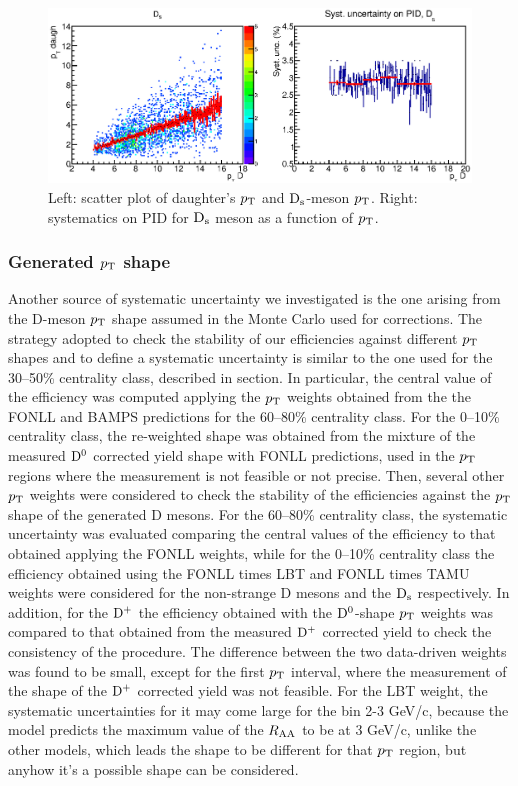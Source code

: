\begin{figure}[!h]
 \centering
 \includegraphics[angle=0, width=13cm]{./FigCap5/PIDsystDs_MCtruth.eps}
 \caption{Left: scatter plot of daughter's $p_{\rm T}$ and ${\rm D_s}$-meson $p_{\rm T}$. Right: systematics on PID for ${\rm D_s}$ meson as a function of $p_{\rm T}$.}
 \label{fig:PerTrackPIDsys} 
\end{figure}

\subsubsection{Generated $p_{\rm T}$ shape}
Another source of systematic uncertainty we investigated is the one arising from the D-meson 
$p_{\rm T}$ shape assumed in the Monte Carlo used for corrections. The strategy adopted to check 
the stability of our efficiencies against different $p_{\rm T}$ shapes and to define a systematic 
uncertainty is similar to the one used for the 30--50\% centrality class, described in section. 
In particular, the central value of the efficiency was computed 
applying the $p_{\rm T}$ weights obtained from the the FONLL and BAMPS predictions for the 
60--80\% centrality class. For the 0--10\% centrality class, the re-weighted shape was obtained 
from the mixture of the measured ${\rm D^0}$ corrected yield shape with FONLL predictions, 
used in the $p_{\rm T}$ regions where the measurement is not feasible or not precise. 
Then, several other $p_{\rm T}$ weights were considered to check the stability of the efficiencies 
against the $p_{\rm T}$ shape of the generated D mesons. For the 60--80\% centrality class, 
the systematic uncertainty was evaluated comparing the central values of the efficiency 
to that obtained applying the FONLL weights, while for the 0--10\% centrality class the 
efficiency obtained using the FONLL times LBT and FONLL times TAMU weights were 
considered for the non-strange D mesons and the ${\rm D_s}$ respectively. 
In addition, for the ${\rm D^+}$ the efficiency obtained with the ${\rm D^0}$-shape $p_{\rm T}$ weights was 
compared to that obtained from the measured ${\rm D^+}$ corrected yield to check 
the consistency of the procedure. The difference between the two data-driven weights 
was found to be small, except for the first $p_{\rm T}$ interval, where the measurement of the 
shape of the ${\rm D^+}$ corrected yield was not feasible.
For the LBT weight, the systematic uncertainties for it may come large for the bin 2-3 GeV/c, 
because the model predicts the maximum value of the $R_{\rm AA}$ to be at 3 GeV/c, unlike the other models, 
which leads the shape to be different for that $p_{\rm T}$ region, but anyhow it's a possible shape can be considered.
 
